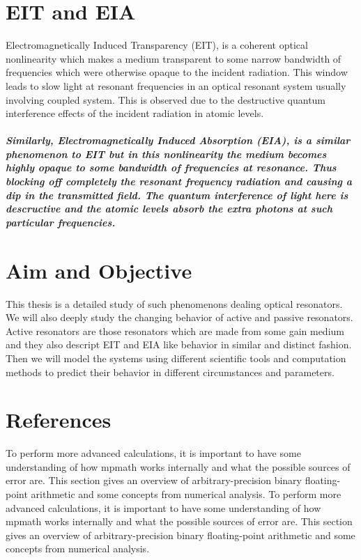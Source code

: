 \newpage

\section{EIT and EIA}
Electromagnetically Induced Transparency (EIT), is a coherent optical nonlinearity which makes a medium transparent to some narrow bandwidth of frequencies which were otherwise opaque to the incident radiation. This window leads to slow light at resonant frequencies in an optical resonant system usually involving coupled system. This is observed due to the destructive quantum interference effects of the incident radiation in atomic levels.

\subparagraph{\normalfont \large Similarly, Electromagnetically Induced Absorption (EIA), is a similar phenomenon to EIT but in this nonlinearity the medium becomes highly opaque to some bandwidth of frequencies at resonance. Thus blocking off completely the resonant frequency radiation and causing a dip in the transmitted field. The quantum interference of light here is descructive and the atomic levels absorb the extra photons at such particular frequencies. }

\newpage
\section{Aim and Objective}
This thesis is a detailed study of such phenomenons dealing optical resonators. We will also deeply study the changing behavior of active and passive resonators. Active resonators are those resonators which are made from some gain medium and they also descript EIT and EIA like behavior in similar and distinct fashion. Then we will model the systems using different scientific tools and computation methods to predict their behavior in different circumstances and parameters. 


\newpage
\section*{References}

To perform more advanced calculations, it is important to have some understanding of how mpmath works internally and what the possible sources of error are. This section gives an overview of arbitrary-precision binary floating-point arithmetic and some concepts from numerical analysis.
To perform more advanced calculations, it is important to have some understanding of how mpmath works internally and what the possible sources of error are. This section gives an overview of arbitrary-precision binary floating-point arithmetic and some concepts from numerical analysis.
